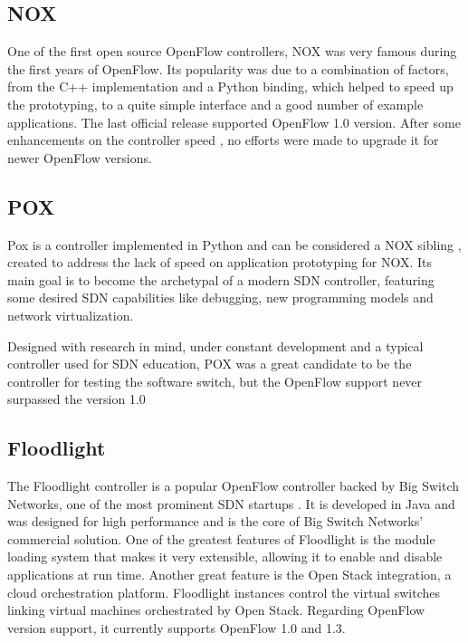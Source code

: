     \subsection{NOX}

    One of the first open source OpenFlow controllers, NOX \cite{nox} was very famous during the first years of OpenFlow. Its popularity was due to a combination of factors, from the C++ implementation and a Python binding, which helped to speed up the prototyping, to a quite simple interface and a good number of example applications. The last official release supported OpenFlow 1.0 version. After some enhancements on the controller speed \cite{nox-mt}, no efforts were made to upgrade it for newer OpenFlow versions. 
    
    \subsection{POX}
    
    Pox is a controller implemented in Python and can be considered a NOX sibling \cite{pox}, created to address the lack of speed on application prototyping for NOX. Its main goal is to become the archetypal of a modern SDN controller, featuring some desired SDN capabilities like debugging, new programming models and network virtualization. 
    
    Designed with research in mind, under constant development and a typical controller used for SDN education, POX was a great candidate to be the controller for testing the software switch, but the OpenFlow support never surpassed the version 1.0
  
    \subsection{Floodlight}

    The Floodlight controller is a popular OpenFlow controller backed by Big Switch Networks, one of the most prominent SDN startups \cite{floodlight}. It is developed in Java and was designed for high performance and is the core of Big Switch Networks' commercial solution. One of the greatest features of Floodlight is the module loading system that makes it very extensible, allowing it to enable and disable applications at run time. Another great feature is the Open Stack integration, a cloud orchestration platform. Floodlight instances control the virtual switches linking virtual machines orchestrated by Open Stack. Regarding OpenFlow version support, it currently supports OpenFlow 1.0 and 1.3. 
  

